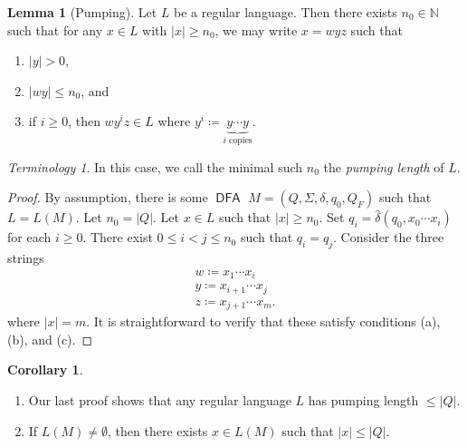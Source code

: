 \documentclass[10pt,letterpaper,cm]{nupset}
\theoremstyle{definition}
\theoremstyle{theorem}
\newtheorem{lemma}[definition]{Lemma}
\newtheorem{corollary}[definition]{Corollary}
\theoremstyle{remark}
\newtheorem*{term}{Terminology}
\newcommand{\N}{\mathbb N}
\newcommand{\1}{\mathbf{1}}
\newcommand{\0}{\vec 0}
\DeclareMathOperator{\DFA}{\mathsf{DFA}}
\begin{document}
\begin{lemma}[Pumping] Let $L$ be a regular language. Then there exists $n_0 \in \N$ such that for any $x\in L$ with $\left\lvert{x}\right\rvert\geq n_0$, we may write $x=wyz$ such that
\begin{enumerate}[label=(\alph*)]
\item $\left\lvert{y}\right\rvert >0$,
\item $\left\lvert{wy}\right\rvert\leq n_0$, and
\item if $i\geq 0$, then $wy^iz \in L$ where $y^i \coloneqq \underbrace{y\cdots y}_{i \text{ copies}}$.
\end{enumerate}
\end{lemma}
\begin{term}
In this case, we call the minimal such $n_0$ the \textit{pumping length} of $L$.
\end{term}
\begin{proof}
By assumption, there is some $\DFA$ $M = \left(Q, \Sigma, \delta, q_0, Q_F\right)$ such that $L = L(M)$. Let $n_0 = \left\lvert{Q}\right\rvert$. Let $x\in L$ such that $\left\lvert{x}\right\rvert\geq n_0$. Set $q_i = \hat{\delta}(q_0, x_0 \cdots x_i)$ for each $i\geq 0$.  There exist $0\leq i<j \leq n_0$ such that $q_i = q_j$. Consider the three strings 
\begin{gather*}
w\coloneqq x_1\cdots x_i 
\\  y\coloneqq  x_{i+1}\cdots x_j 
\\  z\coloneqq x_{j+1} \cdots x_m.
\end{gather*}
where $\left\lvert{x}\right\rvert = m$. It is straightforward to verify that these satisfy conditions (a), (b), and (c).
\end{proof}
\begin{corollary} $ $
\begin{enumerate} 
\item Our last proof shows that any regular language $L$ has pumping length $\leq \left\lvert{Q}\right\rvert$.
\item If $L(M) \ne \emptyset$, then there exists $x\in L(M)$ such that $\left\lvert{x}\right\rvert \leq \left\lvert{Q}\right\rvert$.
\end{enumerate}
\end{corollary}
\end{document}
